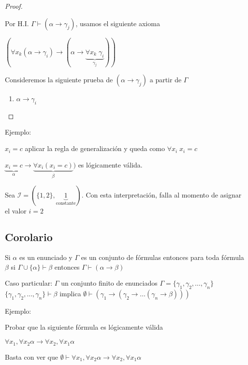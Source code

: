 \begin{proof}
\begin{enumerate}
	Por H.I. $\Gamma \vdash (\alpha \rightarrow \gamma_j)$, usamos el siguiente axioma
	
	$(\forall x_k (\alpha \rightarrow \gamma_i) \rightarrow (\alpha \rightarrow \underbrace{\forall x_k \; \gamma_i}_{\gamma_j}))$
		
\end{enumerate}

Consideremos la siguiente prueba de $(\alpha \rightarrow \gamma_j)$ a partir de $\Gamma$

\begin{enumerate}
	\item $\alpha \rightarrow \gamma_i$
\end{enumerate}

\end{proof}

Ejemplo:

$x_i = c$ aplicar la regla de generalizaci\'on y queda como $\forall x_i \; x_i = c$

$\underbrace{x_i = c}_{\alpha} \rightarrow \underbrace{\forall x_i (x_i = c)}_{\beta})$ es l\'ogicamente v\'alida.

Sea $\mathcal{I} = (\{1, 2\}, \underbrace{1}_{\text{constante}})$. Con esta interpretaci\'on, falla al momento de asignar el valor $i = 2$

\subsection{Corolario}

Si $\alpha$ es un enunciado y $\Gamma$ es un conjunto de f\'ormulas entonces para toda f\'ormula $\beta$ si $\Gamma \cup \{ \alpha \} \vdash \beta$ entonces $\Gamma \vdash (\alpha \rightarrow \beta)$

Caso particular: $\Gamma$ un conjunto finito de enunciados $\Gamma = \{ \gamma_1, \gamma_2, \ldots, \gamma_n\}$ $\{ \gamma_1, \gamma_2, \ldots, \gamma_n\} \vdash \beta$ implica $\emptyset \vdash (\gamma_1 \rightarrow (\gamma_2 \rightarrow \ldots (\gamma_n \rightarrow \beta)))$


Ejemplo:

Probar que la siguiente f\'ormula es l\'ogicamente v\'alida

$\forall x_1, \forall x_2 \alpha \rightarrow \forall x_2, \forall x_1 \alpha$

Basta con ver que $\emptyset \vdash \forall x_1, \forall x_2 \alpha \rightarrow \forall x_2, \forall x_1 \alpha$

